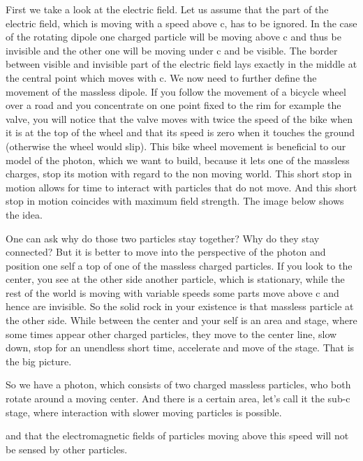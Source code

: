 First we take a look at the electric field. Let us assume that the part of the electric field, which is moving with a speed above c, has to be ignored.
In the case of the rotating dipole one charged particle will be moving above c and thus be invisible and the other one will be moving under c and be visible. The border between visible and invisible part of the electric field lays exactly in the middle at the central point which moves with c.
We now need to further define the movement of the massless dipole. If you follow the movement of a bicycle wheel over a road and you concentrate on one point fixed to the rim for example the valve, you will notice that the valve moves with twice the speed of the bike when it is at the top of the wheel and that its speed is zero when it touches the ground (otherwise the wheel would slip). This bike wheel movement is beneficial to our model of the photon, which we want to build, because it lets one of the massless charges, stop its motion with regard to the non moving world. This short stop in motion allows for time to interact with particles that do not move. And this short stop in motion coincides with maximum field strength.
The image below shows the idea.

One  can ask why do those two particles stay together? Why do they stay connected? But it is better to move into the perspective of the photon and position one self a top of one of the massless charged particles. If you look to the center, you see at the other side another particle, which is stationary, while the rest of the world is moving with variable speeds some parts move above c and hence are invisible. So the solid rock in your existence is that massless particle at the other side. While between the center and your self is an area and stage, where some times appear other charged particles, they move to the center line, slow down, stop for an unendless short time, accelerate and move of the stage. That is the big picture.

So we have a photon, which consists of two charged massless particles, who both rotate around a moving center. And there is a certain area, let's call it the sub-c stage, where interaction with slower moving particles is possible.

and that the electromagnetic fields of particles moving above this speed will not be sensed by other particles. 


%

